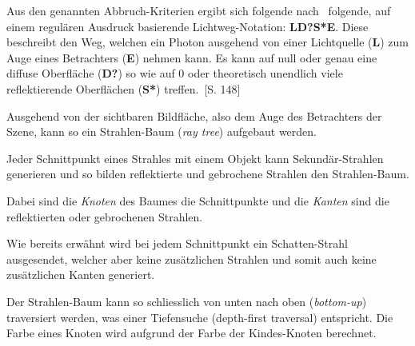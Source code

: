 Aus den genannten Abbruch-Kriterien ergibt sich folgende
nach~\citeauthor{heckbert_adaptive_1990} folgende, auf einem regulären
Ausdruck basierende Lichtweg-Notation: \textbf{LD?S*E}. Diese beschreibt den
Weg, welchen ein Photon ausgehend von einer Lichtquelle (\textbf{L}) zum Auge eines
Betrachters (\textbf{E}) nehmen kann. Es kann auf null oder genau eine diffuse
Oberfläche (\textbf{D?}) so wie auf 0 oder theoretisch unendlich viele reflektierende
Oberflächen (\textbf{S*}) treffen.~\cite{heckbert_adaptive_1990}[S. 148]

Ausgehend von der sichtbaren Bildfläche, also dem Auge des Betrachters
der Szene, kann so ein Strahlen-Baum (\textit{ray tree}) aufgebaut
werden.

Jeder Schnittpunkt eines Strahles mit einem Objekt kann
Sekundär-Strahlen generieren und so bilden reflektierte und gebrochene
Strahlen den Strahlen-Baum.

Dabei sind die \textit{Knoten} des Baumes die Schnittpunkte und die
\textit{Kanten} sind die reflektierten oder gebrochenen Strahlen.

Wie bereits erwähnt wird bei jedem Schnittpunkt ein Schatten-Strahl
ausgesendet, welcher aber keine zusätzlichen Strahlen und somit auch
keine zusätzlichen Kanten generiert.

Der Strahlen-Baum kann so schliesslich von unten nach oben
(\textit{bottom-up}) traversiert werden, was einer Tiefensuche
(depth-first traversal) entspricht. Die Farbe eines Knoten wird aufgrund
der Farbe der Kindes-Knoten berechnet.



